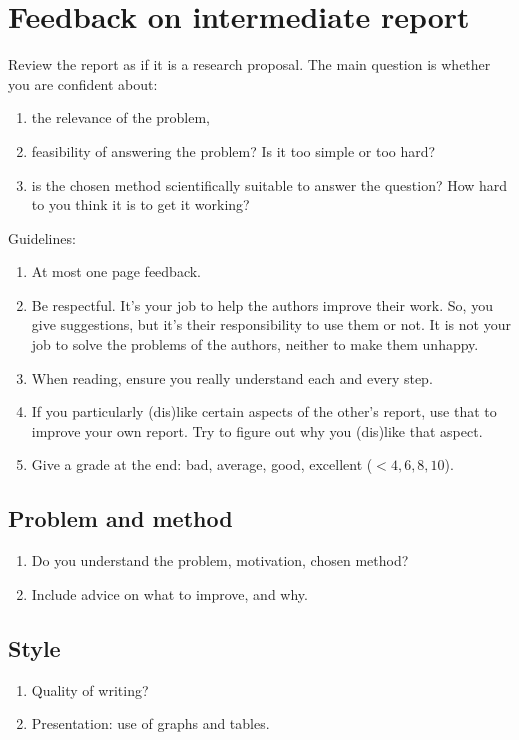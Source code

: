 \documentclass[report]{subfiles}
\begin{document}
\section{Feedback on intermediate report}
\label{sec:feedb-interm-report}

Review the report as if it is a research proposal. The main question is whether you are confident about:
\begin{enumerate}
\item the relevance of the problem,
\item feasibility of answering the problem?  Is it too simple or too hard?
\item is the chosen method scientifically suitable to answer the question? How hard to you think it is to get it working?
\end{enumerate}


Guidelines:
\begin{enumerate}
\item At most one page feedback.
\item Be respectful.
  It's your job to help the authors improve their work.
  So, you give suggestions, but it's their responsibility to use them or not.
  It is not your job to solve the problems of the authors, neither to make them unhappy.
\item When reading, ensure you really understand each and every step.
\item If you particularly (dis)like certain aspects of the other's report, use that to improve your own report. Try to figure out why you (dis)like that aspect.
\item Give a grade at the end: bad, average, good, excellent  ($<4, 6, 8, 10$).
\end{enumerate}

\subsection{Problem and method}
\begin{enumerate}
\item Do you understand the problem, motivation, chosen method?
\item Include advice on what to improve, and why.
\end{enumerate}

\subsection{Style}
\label{sec:style}

\begin{enumerate}
\item Quality of writing?
\item Presentation: use of graphs and tables.
\end{enumerate}
\end{document}
